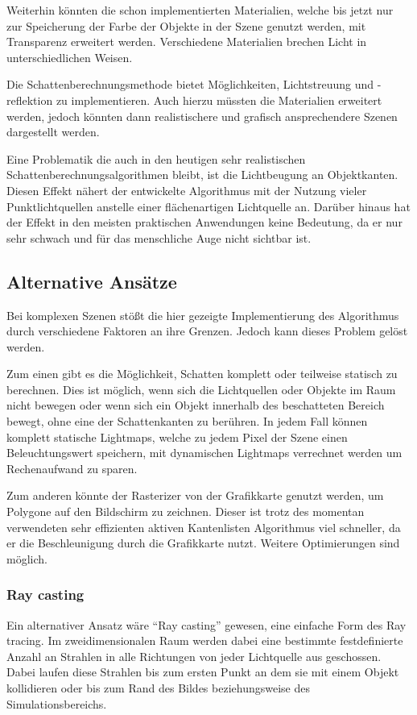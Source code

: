 Weiterhin könnten die schon implementierten Materialien, welche bis jetzt nur zur Speicherung der
Farbe der Objekte in der Szene genutzt werden, mit Transparenz erweitert werden. Verschiedene
Materialien brechen Licht in unterschiedlichen Weisen.

Die Schattenberechnungsmethode bietet Möglichkeiten, Lichtstreuung und -reflektion zu
implementieren. Auch hierzu müssten die Materialien erweitert werden, jedoch könnten dann realistischere und grafisch ansprechendere Szenen dargestellt werden.

Eine Problematik die auch in den heutigen sehr realistischen Schattenberechnungsalgorithmen bleibt, ist die Lichtbeugung an Objektkanten. Diesen Effekt nähert der entwickelte Algorithmus mit der Nutzung vieler Punktlichtquellen anstelle einer flächenartigen Lichtquelle an. Darüber hinaus hat der Effekt in den meisten praktischen Anwendungen keine Bedeutung, da er nur sehr schwach und für das menschliche Auge nicht sichtbar ist.

\subsection{Alternative Ansätze}

Bei komplexen Szenen stößt die hier gezeigte Implementierung des Algorithmus durch verschiedene Faktoren an ihre Grenzen. Jedoch kann dieses Problem
gelöst werden.

Zum einen gibt es die Möglichkeit, Schatten komplett oder teilweise statisch zu berechnen.
Dies ist möglich, wenn sich die Lichtquellen oder Objekte im Raum nicht bewegen oder wenn sich ein Objekt innerhalb
des beschatteten Bereich bewegt, ohne eine der Schattenkanten zu berühren.
In jedem Fall können komplett statische Lightmaps, welche zu jedem Pixel der Szene einen
Beleuchtungswert speichern, mit dynamischen Lightmaps verrechnet werden um Rechenaufwand zu sparen.

Zum anderen könnte der Rasterizer von der Grafikkarte genutzt werden, um Polygone auf den Bildschirm zu zeichnen. Dieser ist trotz des momentan verwendeten sehr effizienten aktiven Kantenlisten Algorithmus viel schneller, da er die Beschleunigung durch die Grafikkarte nutzt. Weitere Optimierungen sind möglich.

\subsubsection*{Ray casting}

Ein alternativer Ansatz wäre "`Ray casting"' gewesen, eine einfache Form des Ray tracing. Im zweidimensionalen
Raum werden dabei eine bestimmte festdefinierte Anzahl an Strahlen in alle Richtungen von jeder Lichtquelle
aus geschossen. Dabei laufen diese Strahlen bis zum ersten Punkt an dem sie mit einem Objekt kollidieren
oder bis zum Rand des Bildes beziehungsweise des Simulationsbereichs.

